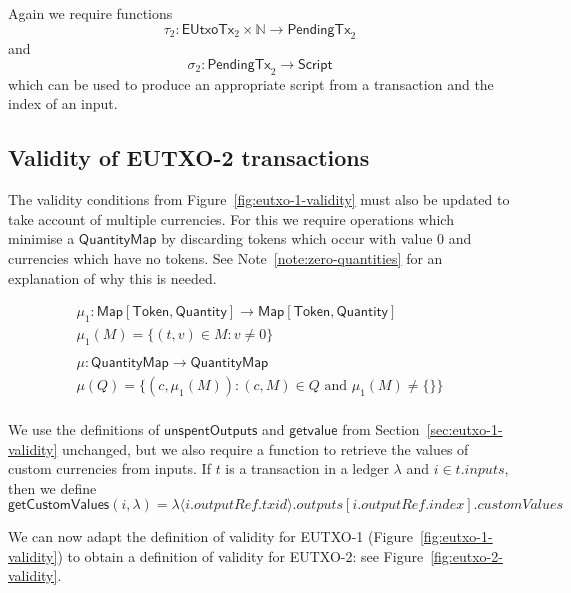 \documentclass[a4paper]{article}
\newcounter{note}
\newcommand{\s}{\textsf}  %
\newcommand{\Map}[2]{\ensuremath{\s{Map}[#1,#2]}}
\newcommand{\script}{\ensuremath{\s{Script}}}
\newcommand{\ptx}{\ensuremath{\s{PendingTx}}}
\newcommand{\mi}[1]{\ensuremath{\mathit{#1}}}
\newcommand{\txid}{\mi{txid}}
\newcommand{\idx}{\mi{index}}
\newcommand{\inputs}{\mi{inputs}}
\newcommand{\outputs}{\mi{outputs}}
\newcommand{\customvals}{\mi{customValues}}
\newcommand{\outputref}{\mi{outputRef}}
\newcommand{\getvalue}{\msf{getvalue}}
\newcommand{\msf}[1]{\ensuremath{\mathsf{#1}}}
\newcommand{\unspent}{\msf{unspentOutputs}}
\newcommand{\eutxotx}{\msf{EUtxoTx}}
\newcommand{\qty}{\ensuremath{\s{Quantity}}}
\newcommand{\token}{\ensuremath{\s{Token}}}
\newcommand{\qtymap}{\ensuremath{\s{QuantityMap}}}
\newcommand\N{\ensuremath{\mathbb{N}}}
\begin{document}
\noindent Again we require functions
$$
\tau_2: \eutxotx_2 \times \N \rightarrow \ptx_2
$$
and
$$
\sigma_2: \ptx_2 \rightarrow \script
$$
which can be used to produce an appropriate script from a transaction
and the index of an input.

\subsection{Validity of EUTXO-2 transactions}
\label{sec:eutxo-2-validity}

\bigskip
\noindent The validity conditions from
Figure~\ref{fig:eutxo-1-validity} must also be updated to take account
of multiple currencies.  For this we require operations which minimise
a $\qtymap$ by discarding tokens which occur with value 0 and currencies
which have no tokens.  See Note~\ref{note:zero-quantities} for an explanation
of why this is needed.

\begin{gather*}
  \mu_1: \Map{\token}{\qty} \rightarrow \Map{\token}{\qty} \\
  \mu_1(M) = \{(t,v) \in M: v \ne 0\}\\
  \\
  \mu: \qtymap  \rightarrow \qtymap\\
  \mu(Q) = \{(c,\mu_1(M)): (c,M) \in Q \mbox{ and } \mu_1(M) \ne \{\}\}\\
\end{gather*}

\newcommand{\mprime}{M^{\prime}}

We use the definitions of \unspent{}  and
\getvalue{} from Section~\ref{sec:eutxo-1-validity} unchanged,
but we also require a function to retrieve the values of
custom currencies from inputs. If $t$ is a transaction in a ledger
$\lambda$ and $i \in t.\inputs$, then we define
$$
\s{getCustomValues}(i,\lambda) = \lambda\langle i.\outputref.\txid
\rangle.\outputs[i.\outputref.\idx].\customvals
$$

We can now adapt the definition of validity for EUTXO-1
(Figure~\ref{fig:eutxo-1-validity}) to obtain a definition of validity for
EUTXO-2: see Figure~\ref{fig:eutxo-2-validity}.
\end{document}
